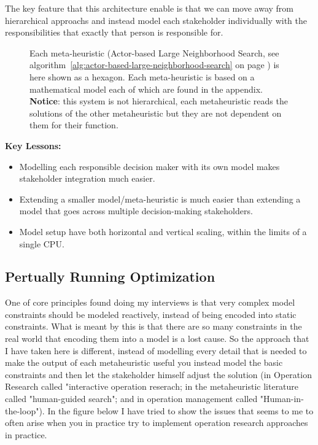 The key feature that this architecture enable is that we can move away from hierarchical approachs and 
instead model each stakeholder individually with the responsibilities that exactly that person is responsible 
for. 

\begin{figure}[H]
	
	\centering
	\drawModelSetupHexagon
	\caption{
		Each meta-heuristic (Actor-based Large Neighborhood Search, see algorithm~\ref{alg:actor-based-large-neighborhood-search} on page \pageref{alg:actor-based-large-neighborhood-search}) is here shown as a hexagon.
		Each meta-heuristic is based on a mathematical model each of which are found in the appendix. \textbf{Notice}: this system is not 
		hierarchical, each metaheuristic reads the solutions of the other metaheuristic but they are not dependent on them for their 
		function.
	}
\end{figure}

\textbf{Key Lessons:}
\begin{itemize}
	\item Modelling each responsible decision maker with its own model makes stakeholder integration much easier.
	\item Extending a smaller model/meta-heuristic is much easier than extending a model that goes across multiple decision-making stakeholders.
	\item Model setup have both horizontal and vertical scaling, within the limits of a single CPU. 
\end{itemize}


\subsection*{Pertually Running Optimization}
One of core principles found doing my interviews is that very complex model constraints should be modeled reactively, instead 
of being encoded into static constraints. What is meant by this is that there are so many constraints in the real world that 
encoding them into a model is a lost cause. So the approach that I have taken here is different, instead of modelling every
detail that is needed to make the output of each metaheuristic useful you instead model the basic constraints and then let 
the stakeholder himself adjust the solution (in Operation Research called "interactive operation reserach; in the metaheuristic literature called
"human-guided search"; and in operation management called "Human-in-the-loop"). In the figure below I have tried to show the issues 
that seems to me to often arise when you in practice try to implement operation research approaches in practice.

